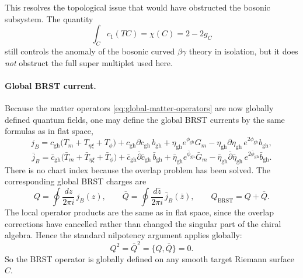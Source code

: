 \documentclass[11pt]{article}
\newcommand{\gh}{\mathrm{gh}}
\begin{document}
This resolves the topological issue that would have obstructed the bosonic subsystem. The quantity
\begin{equation}\label{eq:target-euler}
\int_C c_1(TC)=\chi(C)=2-2g_C
\end{equation}
still controls the anomaly of the bosonic curved $\beta\gamma$ theory in isolation, but it does \emph{not} obstruct the full super multiplet used here.

\paragraph{Global BRST current.}
Because the matter operators \eqref{eq:global-matter-operators} are now globally defined quantum fields, one may define the global BRST currents by the same formulas as in flat space,
\begin{equation}\label{eq:local-brst-current}
j_B
=
c_{\gh}\bigl(T_m+T_{\eta\xi}+T_\phi\bigr)
+c_{\gh}\partial c_{\gh}\,b_{\gh}
+\eta_{\gh}e^{\phi_{\gh}}G_m
-\eta_{\gh}\partial\eta_{\gh}\,e^{2\phi_{\gh}}b_{\gh},
\end{equation}
\begin{equation}\label{eq:global-antiholo-brst}
\bar j_B
=
\bar c_{\gh}\bigl(\bar T_m+\bar T_{\eta\xi}+\bar T_\phi\bigr)
+\bar c_{\gh}\bar\partial \bar c_{\gh}\,\bar b_{\gh}
+\bar\eta_{\gh}e^{\bar\phi_{\gh}}\bar G_m
-\bar\eta_{\gh}\bar\partial\bar\eta_{\gh}\,e^{2\bar\phi_{\gh}}\bar b_{\gh}.
\end{equation}
There is no chart index because the overlap problem has been solved. The corresponding global BRST charges are
\begin{equation}\label{eq:global-brst-charge}
Q=\oint\frac{dz}{2\pi i}\,j_B(z),
\qquad
\bar Q=\oint\frac{d\bar z}{2\pi i}\,\bar j_B(\bar z),
\qquad
Q_{\mathrm{BRST}}=Q+\bar Q.
\end{equation}
The local operator products are the same as in flat space, since the overlap corrections have cancelled rather than changed the singular part of the chiral algebra. Hence the standard nilpotency argument applies globally:
\begin{equation}\label{eq:global-nilpotency}
Q^2=\bar Q^2=\{Q,\bar Q\}=0.
\end{equation}
So the BRST operator is globally defined on any smooth target Riemann surface $C$.
\end{document}
